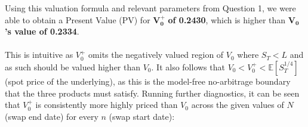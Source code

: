 \documentclass{article}
\begin{document}
\noindent Using this valuation formula and relevant parameters from Question 1, we were able to obtain a Present Value (PV) for $\boldsymbol{V_0^+}$\textbf{ of 0.2430}, which is higher than $\boldsymbol{V_0}$\textbf{'s value of 0.2334}. \\ \\

\noindent This is intuitive as $V_0^+$ omits the negatively valued region of $V_0$ where $S_T < L$ and as such should be valued higher than $V_0$. It also follows that $V_0<V_0^+< \mathbb{E} \left[S_T^{1/4}\right]$ (spot price of the underlying), as this is the model-free no-arbitrage boundary that the three products must satisfy. Running further diagnostics, it can be seen that $V_0^+$ is consistently more highly priced than $V_0$ across the given values of $N$ (swap end date) for every $n$ (swap start date):

\begin{figure}[h]
	\centering
	\hspace{0.05em}
	\hspace{0.05em}
\end{figure}
\end{document}
